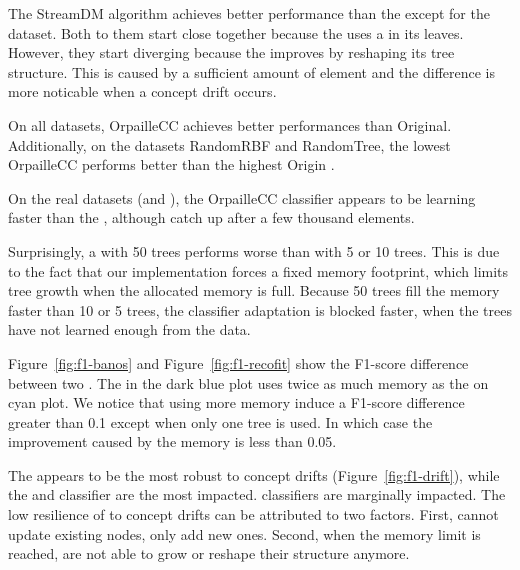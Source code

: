 The StreamDM \hoeffdingtree algorithm achieves better performance than the
\naivebayes except for the \banosdataset dataset.  Both to them start close
together because the \hoeffdingtree uses a \naivebayes in its leaves.  However,
they start diverging because the \hoeffdingtree improves by reshaping its tree
structure.  This is caused by a sufficient amount of element and the difference
is more noticable when a concept drift occurs.

On all datasets, \mcnn OrpailleCC achieves better performances than \mcnn
Original. Additionally, on the datasets RandomRBF and RandomTree, the lowest
\mcnn OrpailleCC performs better than the highest \mcnn Origin .

On the real datasets (\banosdataset and \recofitdataset), the \mcnn OrpailleCC
classifier appears to be learning faster than the \mondrianforest, although
\mondrianforest catch up after a few thousand elements. 

Surprisingly, a \mondrianforest with 50 trees performs worse than with 5 or 10
trees. This is due to the fact that our \mondrianforest implementation forces a
fixed memory footprint, which limits tree growth when the allocated memory is
full. Because 50 trees fill the memory faster than 10 or 5 trees, the
classifier adaptation is blocked faster, when the trees have not learned enough
from the data.

Figure~\ref{fig:f1-banos} and Figure~\ref{fig:f1-recofit} show the F1-score
difference between two \mondrianforest. The \mondrianforest in the dark blue
plot uses twice as much memory as the on cyan plot. We notice that using more
memory induce a F1-score difference greater than 0.1 except when only one tree
is used. In which case the improvement caused by the memory is less than 0.05.

The \hoeffdingtree appears to be the most robust to concept drifts
(Figure~\ref{fig:f1-drift}), while the \mondrianforest and \naivebayes
classifier are the most impacted. \mcnn classifiers are marginally impacted.
The low resilience of \mondrianforest to concept drifts can be attributed to
two factors. First, \mondrianforest cannot update existing nodes, only add new ones.
Second, when the memory limit is reached, \mondrianforest are not able to grow
or reshape their structure anymore.

